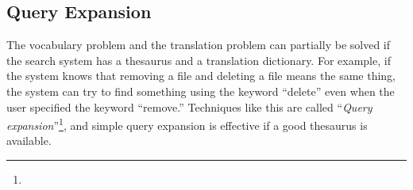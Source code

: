 \documentclass[manuscript,anonymous,review]{acmart}
\begin{document}

\subsection*{Query Expansion}

% 
%

The vocabulary problem and the translation problem can partially be solved
if the search system has a thesaurus and a translation dictionary.
%
For example, 
if the system knows that removing a file and deleting a file means the same thing,
the system can try to find something using the keyword ``delete''
even when the user specified the keyword ``remove.''
%
Techniques like this are called ``\textit{Query expansion}''\footnote{
},
and simple query expansion is effective if a good thesaurus is available.

% 
\end{document}
